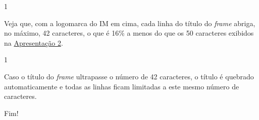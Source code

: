 \documentclass{beamer}
\begin{document}
\begin{frame}{1}

  Veja que, com a logomarca do IM em cima, cada linha do título do \emph{frame} abriga, no máximo, 42 caracteres, o que é 16\% a menos do que os 50 caracteres exibidos na \href{run:apresentacao2.pdf}{Apresentação 2}.

\end{frame}

\begin{frame}{1}

  Caso o título do \emph{frame} ultrapasse o número de 42 caracteres, o título é quebrado automaticamente e todas as linhas ficam limitadas a este mesmo número de caracteres.

\end{frame}

\begin{frame}

  \centerline{\Large Fim!}

\end{frame}
\end{document}
